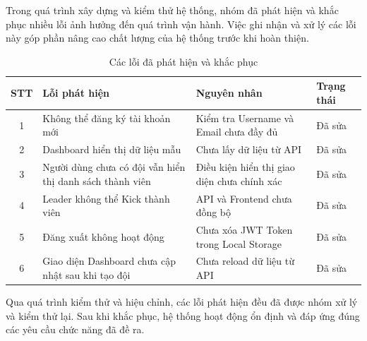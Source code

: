 Trong quá trình xây dựng và kiểm thử hệ thống, nhóm đã phát hiện và khắc phục nhiều lỗi ảnh hưởng đến quá trình vận hành. Việc ghi nhận và xử lý các lỗi này góp phần nâng cao chất lượng của hệ thống trước khi hoàn thiện.

\begin{table}[H]
	\centering
	\caption{Các lỗi đã phát hiện và khắc phục}
	\label{tab:bug-summary}
	\renewcommand{\arraystretch}{1.3}
	
	\begin{tabular}{|c|p{5cm}|p{4cm}|p{3cm}|}
		
		\hline
		
		\textbf{STT} &
		\textbf{Lỗi phát hiện} &
		\textbf{Nguyên nhân} &
		\textbf{Trạng thái}
		
		\\
		\hline
		
		1 &
		Không thể đăng ký tài khoản mới &
		Kiểm tra Username và Email chưa đầy đủ &
		Đã sửa
		
		\\
		\hline
		
		2 &
		Dashboard hiển thị dữ liệu mẫu &
		Chưa lấy dữ liệu từ API &
		Đã sửa
		
		\\
		\hline
		
		3 &
		Người dùng chưa có đội vẫn hiển thị danh sách thành viên &
		Điều kiện hiển thị giao diện chưa chính xác &
		Đã sửa
		
		\\
		\hline
		
		4 &
		Leader không thể Kick thành viên &
		API và Frontend chưa đồng bộ &
		Đã sửa
		
		\\
		\hline
		
		5 &
		Đăng xuất không hoạt động &
		Chưa xóa JWT Token trong Local Storage &
		Đã sửa
		
		\\
		\hline
		
		6 &
		Giao diện Dashboard chưa cập nhật sau khi tạo đội &
		Chưa reload dữ liệu từ API &
		Đã sửa
		
		\\
		\hline
		
	\end{tabular}
	
\end{table}

Qua quá trình kiểm thử và hiệu chỉnh, các lỗi phát hiện đều đã được nhóm xử lý và kiểm thử lại. Sau khi khắc phục, hệ thống hoạt động ổn định và đáp ứng đúng các yêu cầu chức năng đã đề ra.

